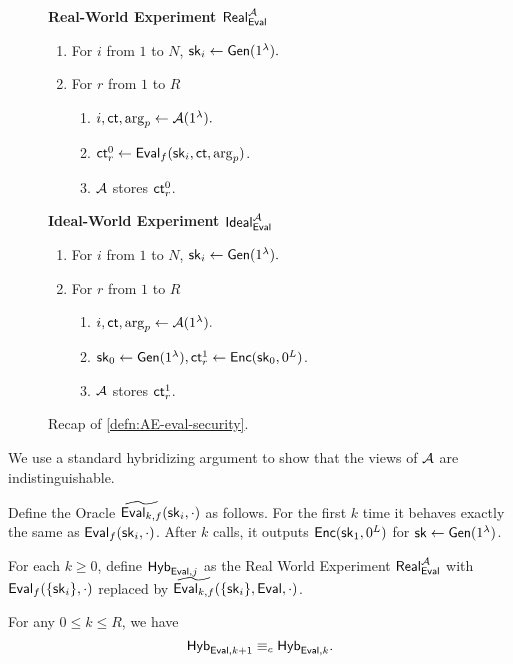 \begin{figure}[ht!]
\begin{framed}
\textbf{Real-World Experiment $\mathsf{Real}^{\mathcal{A}}_{\mathsf{Eval}}$}
\begin{enumerate}
    \item For $i$ from $1$ to $N$, ${\mathsf{sk}}_i \leftarrow \mathsf{Gen}(1^{\lambda}).$
    \item For $r$ from $1$ to $R$
    \begin{enumerate}
        \item $i, \mathsf{ct}, \arg_p \leftarrow \mathcal{A}(1^{\lambda}).$
        \item $\mathsf{ct}^{0}_r \leftarrow \mathsf{Eval}_f({\mathsf{sk}}_i, \mathsf{ct}, \arg_p)$.
        \item $\mathcal{A}$ stores $\mathsf{ct}^{0}_r$.
    \end{enumerate}
\end{enumerate}
\vspace{0.2cm}
\textbf{Ideal-World Experiment $\mathsf{Ideal}^{\mathcal{A}}_{\mathsf{Eval}}$}
\begin{enumerate}
    \item For $i$ from $1$ to $N$, ${\mathsf{sk}}_i \leftarrow \mathsf{Gen}(1^{\lambda}).$
    \item For $r$ from $1$ to $R$
    \begin{enumerate}
        \item $i, \mathsf{ct}, \arg_p \leftarrow \mathcal{A}(1^{\lambda}).$
        \item ${\mathsf{sk}}_0 \leftarrow \mathsf{Gen}(1^{\lambda}), \mathsf{ct}^{1}_r \leftarrow \mathsf{Enc}({\mathsf{sk}}_0, 0^L)$.
        \item $\mathcal{A}$ stores $\mathsf{ct}^{1}_r$.
    \end{enumerate}
\end{enumerate}
\end{framed}
\caption{Recap of \cref{defn:AE-eval-security}.}
\end{figure}
We use a standard hybridizing argument to show that the views of $\mathcal{A}$ are indistinguishable. 
\begin{definition}
Define the Oracle $\widetilde{\mathsf{Eval}_{k, f}}({\mathsf{sk}}_i, \cdot)$ as follows. For the first $k$ time it behaves exactly the same as $\mathsf{Eval}_f({\mathsf{sk}}_i, \cdot)$. After $k$ calls, it outputs $\mathsf{Enc}({\mathsf{sk}}_1, 0^L)$ for ${\mathsf{sk}} \leftarrow \mathsf{Gen}(1^{\lambda})$.

For each $k \geq 0$, define $\mathsf{Hyb}_{\mathsf{Eval}, j}$ as the Real World Experiment $\mathsf{Real}_{\mathsf{Eval}}^{\mathcal{A}}$ with $\mathsf{Eval}_f(\{{\mathsf{sk}}_i\}, \cdot)$ replaced by $\widetilde{\mathsf{Eval}_{k, f}}(\{{\mathsf{sk}}_i\}, \mathsf{Eval}, \cdot)$. 
\end{definition}
\begin{lemma}
    For any $0 \leq k \leq R$, we have 
    $$\mathsf{Hyb}_{\mathsf{Eval}, k + 1} \equiv_c \mathsf{Hyb}_{\mathsf{Eval}, k}.$$
\end{lemma}
